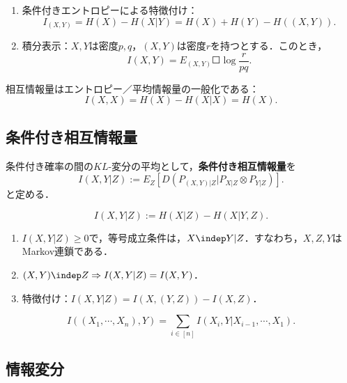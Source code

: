 \documentclass[uplatex,dvipdfmx]{jsreport}
\begin{document}
\begin{theorem}[特徴付け]\mbox{}
    \begin{enumerate}
        \item 条件付きエントロピーによる特徴付け：
        \[I_{(X,Y)}=H(X)-H(X|Y)=H(X)+H(Y)-H((X,Y)).\]
        \item 積分表示：$X,Y$は密度$p,q$，$(X,Y)$は密度$r$を持つとする．このとき，
        \[I(X,Y)=E_{(X,Y)}\Square{\log\frac{r}{pq}}.\]
    \end{enumerate}
\end{theorem}

\begin{corollary}
    相互情報量はエントロピー／平均情報量の一般化である：
    \[I(X,X)=H(X)-H(X|X)=H(X).\]
\end{corollary}

\subsection{条件付き相互情報量}

\begin{definition}
    条件付き確率の間の$KL$-変分の平均として，\textbf{条件付き相互情報量}を
    \[I(X,Y|Z):=E_Z[D(P_{(X,Y)|Z}|P_{X|Z}\otimes P_{Y|Z})].\]
    と定める．
\end{definition}

\begin{theorem}[条件付きエントロピーによる特徴付け]
    \[I(X,Y|Z):=H(X|Z)-H(X|Y,Z).\]
\end{theorem}

\begin{proposition}[相互情報量による特徴付け]\mbox{}
    \begin{enumerate}
        \item $I(X,Y|Z)\ge0$で，等号成立条件は，$X\indep Y|Z$．すなわち，$X,Z,Y$はMarkov連鎖である．
        \item $(X,Y)\indep Z\Rightarrow I(X,Y|Z)=I(X,Y)$．
        \item 特徴付け：$I(X,Y|Z)=I(X,(Y,Z))-I(X,Z)$．
    \end{enumerate}
\end{proposition}

\begin{corollary}[連鎖律]
    \[I((X_1,\cdots,X_n),Y)=\sum_{i\in[n]}I(X_i,Y|X_{i-1},\cdots,X_1).\]
\end{corollary}

\subsection{情報変分}
\end{document}
